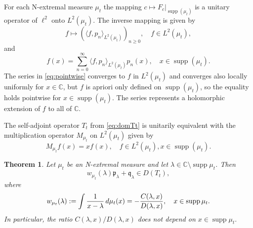 \documentclass [12pt]{article}
\newtheorem{thm}{Theorem}[section]
\DeclareMathOperator{\supp}{supp}
\newcommand{\C}{\mathbb{C}}
\begin{document}
For each N-extremal measure $\mu_t$ the mapping $c\mapsto F_c|_{\supp(\mu_t)}$ is a unitary operator of $\ell^2$ onto $L^2(\mu_t)$. The inverse mapping is given by
$$
f\mapsto \left(\langle f, p_n\rangle_{L^2(\mu_t)}\right)_{n\ge 0},\quad f\in L^2(\mu_t),
$$ 
and
\begin{equation}\label{eq:pointwise}
f(x)=\sum_{n=0}^\infty \langle f, p_n\rangle_{L^2(\mu_t)}p_n(x),\quad x\in\supp(\mu_t).
\end{equation}
The series in \eqref{eq:pointwise} converges to $f$ in $L^2(\mu_t)$ and converges also locally uniformly for $x\in\C$, but $f$ is apriori only defined on $\supp(\mu_t)$, so the equality holds pointwise for $x\in\supp(\mu_t)$. The series represents a holomorphic extension of $f$ to all of $\C$.
 
The self-adjoint operator $T_t$ from 
\eqref{eq:domTt} is unitarily equivalent with the multiplication operator $M_{\mu_t}$ on
$L^2(\mu_t)$ given by
\begin{equation*}\label{eq:Mt}
M_{\mu_t}f(x)=xf(x),\quad f\in L^2(\mu_t), x\in \supp(\mu_t).
\end{equation*}

\begin{thm}\label{thm:pro1} Let $\mu_t$ be an N-extremal measure and let $\lambda\in \C\setminus \supp\mu_t$.  
 Then
\begin{equation}\label{eq:imp}w_{\mu_t}(\lambda)\mathfrak{p}_\lambda+\mathfrak{q}_\lambda \in D(T_t),
\end{equation}
 where
\begin{equation}\label{eq:w}
w_{\mu_t}(\lambda):=\int {1\over x-\lambda}\,d\mu_t(x) =-{C(\lambda,x)\over D(\lambda,x)},\quad x\in \supp\mu_t.
\end{equation}
In particular, the ratio $C(\lambda,x)/D(\lambda,x)$
  does not depend on $x\in \supp\mu_t.$
\end{thm}
\end{document}
